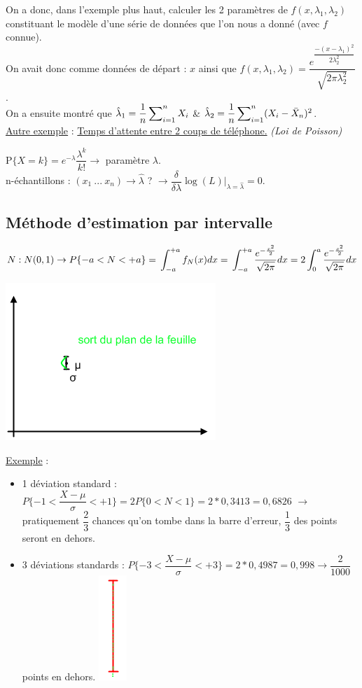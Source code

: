 \documentclass{article}
\newcommand{\lcha}{\hat{\lambda}}
\begin{document}
On a donc, dans l'exemple plus haut, calculer les 2 paramètres de $f(x,\lambda_1,\lambda_2)$ constituant le modèle d'une série
de données que l'on nous a donné (avec $f$ connue). \\ On avait donc comme données de départ : $x$ ainsi que 
$f(x,\lambda_1,\lambda_2) = \dfrac{e^{\dfrac{-(x-\lambda_1)^2}{2\lambda_2^2}}}{\sqrt{2\pi\lambda_2^2}}$. \\ On a ensuite montré
que $\lcha_1 = \dfrac{1}{n} \sideset{}{_{i=1}^n}\sum X_i$ \& $\lcha_2 = \dfrac{1}{n} 
\sideset{}{_{i=1}^n}\sum(X_i-\bar{X}_n)^2$. \\

\noindent\underline{Autre exemple} : \underline{Temps d'attente entre 2 coups de téléphone.} \textit{(Loi de Poisson)}

\noindent P$\{X=k\} = e^{-\lambda} \dfrac{\lambda^k}{k!} \rightarrow$ paramètre $\lambda$. \\
n-échantillons : $(x_1\ ...\ x_n) \rightarrow \lcha$ ? $\rightarrow \dfrac{\delta}{\delta\lambda} \log{(L)} 
|_{\lambda=\lcha} = 0$.

\subsection{Méthode d'estimation par intervalle}

$N:N(0,1) \rightarrow P\{ -a < N < +a \} = \sideset{}{_{-a}^{+a}}\int f_N(x)dx = 
\sideset{}{_{-a}^{+a}}\int \dfrac{e^{-\frac{x^2}{2}}}{\sqrt{2\pi}} dx= 
2 \sideset{}{_{0}^{a}}\int \dfrac{e^{-\frac{x^2}{2}}}{\sqrt{2\pi}} dx$

\includegraphics{Figure2-6.png}

\underline{Exemple} : 
\begin{itemize}
\item 1 déviation standard : $P\{ -1 < \dfrac{X-\mu}{\sigma} < +1 \} = 2P\{0<N<1\} = 2 * 0,3413 = 0,6826$
$\rightarrow$ pratiquement $\dfrac{2}{3}$ chances qu'on tombe dans la barre d'erreur, $\dfrac{1}{3}$ des points seront en
dehors.
\item 3 déviations standards : $P\{ -3 < \dfrac{X-\mu}{\sigma} < +3 \} = 2 * 0,4987 = 0,998 \rightarrow \dfrac{2}{1000}$ points
en dehors.
\includegraphics{Figure2-7.png}
\end{itemize}
\end{document}
